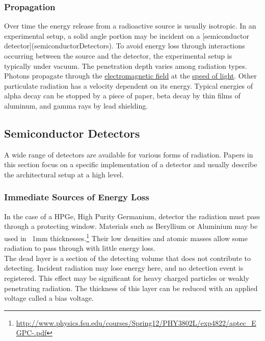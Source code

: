 \documentclass[12pt]{article}
\begin{document}
\begin{doublespacing}
\subsubsection{Propagation}
Over time the energy release from a radioactive source is usually isotropic. In an experimental setup, a solid angle portion may be incident on a [semiconductor detector](semiconductorDetectors). To avoid energy loss through interactions occurring between the source and the detector, the experimental setup is typically under vacuum. 
The penetration depth varies among radiation types. Photons propagate through the \href{https://en.wikipedia.org/wiki/Electromagnetic_field}{electromagnetic field} at the \href{https://en.wikipedia.org/wiki/Speed_of_light}{speed of light}. Other particulate radiation has a velocity dependent on its energy. Typical energies of alpha decay can be stopped by a piece of paper, beta decay by thin films of aluminum, and gamma rays by lead shielding.


\subsection{Semiconductor Detectors}   %
A wide range of detectors are available for various forms of radiation.
Papers in this section focus on a specific implementation of a detector and usually describe the architectural setup at a high level.

\subsubsection{Immediate Sources of Energy Loss}

In the case of a HPGe, High Purity Germanium, detector the radiation must pass through a protecting window. 
Materials such as Beryllium or Aluminium may be used in ~1mm thicknesses.\footnote{\url{http://www.physics.fsu.edu/courses/Spring12/PHY3802L/exp4822/aptec_EGPC-.pdf}} 
Their low densities and atomic masses allow some radiation to pass through with little energy loss.
\\

The dead layer is a section of the detecting volume that does not contribute to detecting. 
Incident radiation may lose energy here, and no detection event is registered. 
This effect may be significant for heavy charged particles or weakly penetrating radiation.
The thickness of this layer can be reduced with an applied voltage called a bias voltage.
\\



\end{doublespacing}
\end{document}
